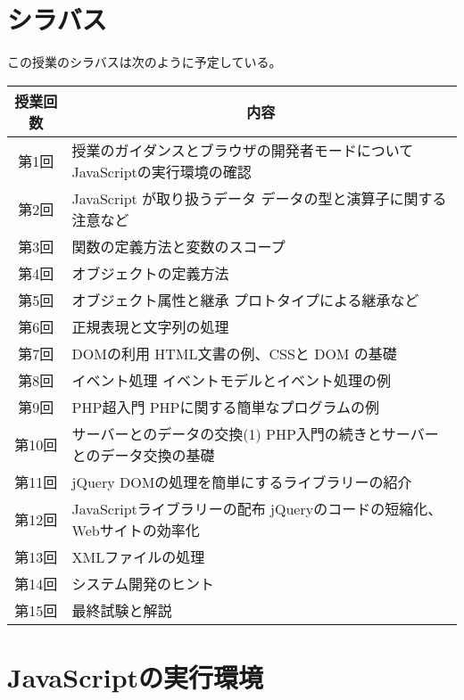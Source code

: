 \section{シラバス}
この授業のシラバスは次のように予定している。
\begin{center}
\begin{tabular}{|c|m{}|}\hline
 授業回数&\multicolumn{1}{c|}{内容}\\\hline
 第1回&授業のガイダンスとブラウザの開発者モードについて \newline
     JavaScriptの実行環境の確認\\\hline
 第2回&JavaScript が取り扱うデータ\newline
     データの型と演算子に関する注意など\\\hline
 第3回& 関数の定義方法と変数のスコープ\\\hline
 第4回& オブジェクトの定義方法\\\hline
 第5回&オブジェクト属性と継承\newline
     プロトタイプによる継承など\\\hline
 第6回&正規表現と文字列の処理  \\\hline
 第7回&DOMの利用\newline
     HTML文書の例、CSSと DOM の基礎\\\hline
 第8回&イベント処理 \newline
     イベントモデルとイベント処理の例\\\hline
 第9回&PHP超入門\newline
       PHPに関する簡単なプログラムの例\\\hline
 第10回&サーバーとのデータの交換(1)\newline
     PHP入門の続きとサーバーとのデータ交換の基礎\\\hline
 第11回&jQuery \newline
     DOMの処理を簡単にするライブラリーの紹介\\   \hline
 第12回&JavaScriptライブラリーの配布\newline
     jQueryのコードの短縮化、Webサイトの効率化 \\\hline
 第13回&XMLファイルの処理\\\hline
 第14回&システム開発のヒント\\\hline
 第15回&最終試験と解説\\ \hline
\end{tabular}
\end{center}
\section{JavaScriptの実行環境}


